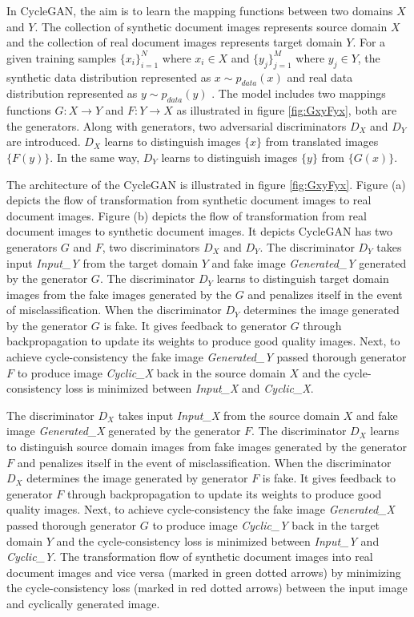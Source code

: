 In \ac{CycleGAN}, the aim is to learn the mapping functions between two domains $X$ and $Y$. The collection of synthetic document images represents source domain $X$ and the collection of real document images represents target domain $Y$. For a given training samples $\{x_i\}_{i=1}^{N}$ where $x_i \in X$ and $\{y_j\}_{j=1}^{M}$ where $y_j \in Y$, the synthetic data distribution represented as $x \sim p_{data}(x)$ and real data distribution represented as $y \sim p_{data}(y)$ \cite{zhao2021unpaired}. The model includes two mappings functions $G : X \rightarrow Y$ and $F : Y \rightarrow X$ as illustrated in figure \ref{fig:GxyFyx}, both are the generators. Along with generators, two adversarial discriminators $D_X$ and $D_Y$ are introduced. $D_X$ learns to distinguish images $\{x\}$ from translated images $\{F(y)\}$. In the same way, $D_Y$ learns to distinguish images $\{y\}$ from $\{G(x)\}$.

The architecture of the \ac{CycleGAN} is illustrated in figure \ref{fig:GxyFyx}. Figure (a) depicts the flow of transformation from synthetic document images to real document images. Figure (b) depicts the flow of transformation from real document images to synthetic document images. It depicts \ac{CycleGAN} has two generators $G$ and $F$, two discriminators $D_X$ and $D_Y$. The discriminator $D_Y$ takes input \textit{Input\_Y} from the target domain $Y$ and fake image \textit{Generated\_Y} generated by the generator $G$. The discriminator $D_Y$ learns to distinguish target domain images from the fake images generated by the $G$ and penalizes itself in the event of misclassification. When the discriminator $D_Y$ determines the image generated by the generator $G$ is fake. It gives feedback to generator $G$ through backpropagation to update its weights to produce good quality images. Next, to achieve cycle-consistency the fake image \textit{Generated\_Y} passed thorough generator $F$ to produce image \textit{Cyclic\_X} back in the source domain $X$ and the cycle-consistency loss is minimized between \textit{Input\_X} and \textit{Cyclic\_X}. 

The discriminator $D_X$ takes input \textit{Input\_X} from the source domain $X$ and fake image \textit{Generated\_X} generated by the generator $F$. The discriminator $D_X$ learns to distinguish source domain images from fake images generated by the generator $F$ and penalizes itself in the event of misclassification. When the discriminator $D_X$ determines the image generated by generator $F$ is fake. It gives feedback to generator $F$ through backpropagation to update its weights to produce good quality images. Next, to achieve cycle-consistency the fake image \textit{Generated\_X} passed thorough generator $G$ to produce image \textit{Cyclic\_Y} back in the target domain $Y$ and the cycle-consistency loss is minimized between \textit{Input\_Y} and \textit{Cyclic\_Y}. The transformation flow of synthetic document images into real document images and vice versa (marked in green dotted arrows) by minimizing the cycle-consistency loss (marked in red dotted arrows) between the input image and cyclically generated image. 


